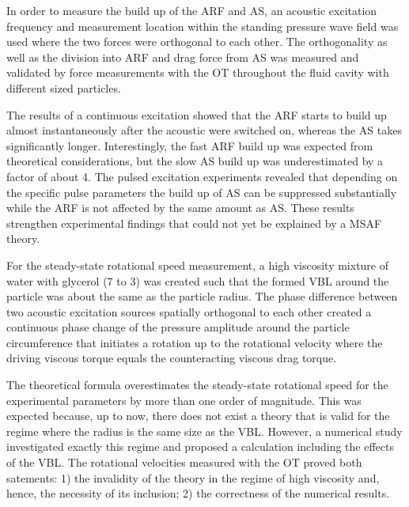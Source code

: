 In order to measure the build up of the ARF and AS, an acoustic excitation 
frequency and measurement location within the standing pressure wave field was 
used where the two forces were orthogonal to each other. The orthogonality as 
well as the division into ARF and drag force from AS was measured and validated 
by force measurements with the OT throughout the fluid cavity with different 
sized particles.

The results of a continuous excitation showed that the ARF starts to build up 
almost instantaneously after the acoustic were switched on, whereas the AS 
takes significantly longer. Interestingly, the fast ARF build up was expected 
from theoretical considerations, but the slow AS build up was underestimated by 
a factor of about 4. The pulsed excitation experiments revealed that depending 
on the specific pulse parameters the build up of AS can be suppressed 
substantially while the ARF is not affected by the same amount as AS. These 
results strengthen experimental findings that could not yet be explained by a 
MSAF theory.

For the steady-state rotational speed measurement, a high viscosity mixture of 
water with glycerol (7 to 3) was created such that the formed VBL around the 
particle was about the same as the particle radius. The phase difference 
between two acoustic excitation sources spatially orthogonal to each other 
created a continuous phase change of the pressure amplitude around the particle 
circumference that initiates a rotation up to the rotational velocity where the 
driving viscous torque equals the counteracting viscous drag torque.

The theoretical formula overestimates the steady-state rotational speed for the 
experimental parameters by more than one order of magnitude. This was expected 
because, up to now, there does not exist a theory that is valid for the regime 
where the radius is the same size as the VBL. However, a numerical study 
investigated exactly this regime and proposed a calculation including the 
effects of the VBL. The rotational velocities measured with the OT proved both 
satements: 1) the invalidity of the theory in the regime of high viscosity and, 
hence, the necessity of its inclusion; 2) the correctness of the numerical 
results.

